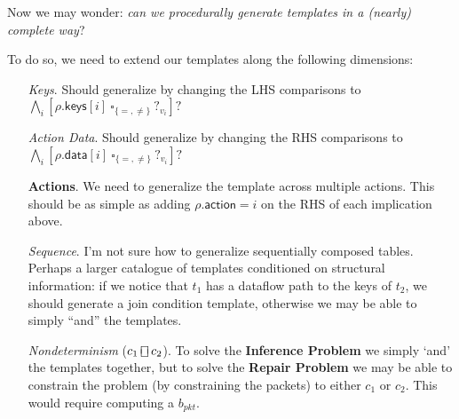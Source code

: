 \documentclass{article}
\newcommand{\action}{\mathsf{action}}
\newcommand{\keys}{\mathsf{keys}}
\newcommand{\data}{\mathsf{data}}
\newcommand{\choiceop}{\rotatebox[origin=c]{90}{$\sqsubset\!\!\!\sqsupset$}}
\newcommand{\choice}{\mathbin{\choiceop}}
\theoremstyle{plain}
\theoremstyle{definition}
\theoremstyle{remark}
\begin{document}
Now we may wonder: \emph{can we procedurally generate templates in a (nearly) complete way}?

To do so, we need to extend our templates along the following dimensions:
\begin{enumerate}[align=left]
\item[\textit{Keys}.] Should generalize by changing the LHS comparisons to $
  \bigwedge_i[\rho.\keys[i]~\square_{\{=,\neq\}}~?_{v_i}]?$
\item[\textit{Action Data}.] Should generalize by changing the RHS comparisons to $\bigwedge_i[\rho.\data[i]~\square_{\{=,\neq\}}~?_{v_i}]?$
\item[\textbf{Actions}.] We need to generalize the template across multiple actions. This should be as simple as adding $\rho.\action = i$ on the RHS of each implication above.
\item[\textit{Sequence}.] I'm not sure how to generalize sequentially composed tables.
  Perhaps a larger catalogue of templates conditioned on structural information:
  if we notice that $t_1$ has a dataflow path to the keys of $t_2$, we should
  generate a join condition template, otherwise we may be able to simply ``and'' the templates.

\item[\textit{Nondeterminism} ($c_1 \choice c_2$).] To solve the
  \textbf{Inference Problem} we simply `and' the templates together, but to solve
  the \textbf{Repair Problem} we may be able to constrain the problem (by
  constraining the packets) to either $c_1$ or $c_2$. This would require
  computing a $b_{\textit{pkt}}$.
\end{enumerate}
\end{document}
